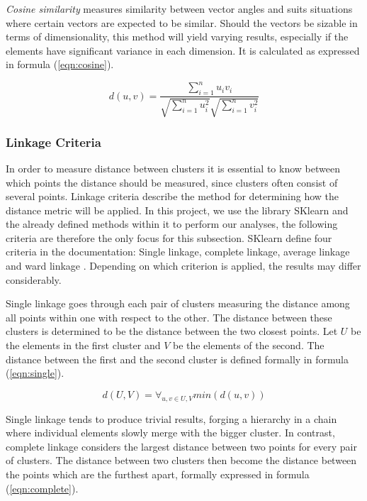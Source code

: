 \textit{Cosine similarity} measures similarity between vector angles and suits situations where certain vectors are expected to be similar. Should the vectors be sizable in terms of dimensionality, this method will yield varying results, especially if the elements have significant variance in each dimension. It is calculated as expressed in formula (\ref{eqn:cosine}).

\begin{equation}
\label{eqn:cosine}
d(u, v) = \frac{\sum_{i=1}^n u_iv_i}{\sqrt{\sum_{i=1}^n u_i^2}\sqrt{\sum_{i=1}^n v_i^2}}
\end{equation}

\subsubsection{Linkage Criteria}
In order to measure distance between clusters it is essential to know between which points the distance should be measured, since clusters often consist of several points. Linkage criteria describe the method for determining how the distance metric will be applied. In this project, we use the library SKlearn and the already defined methods within it to perform our analyses, the following criteria are therefore the only focus for this subsection. SKlearn define four criteria in the documentation: Single linkage, complete linkage, average linkage and ward linkage \cite{scikit}. Depending on which criterion is applied, the results may differ considerably.

Single linkage goes through each pair of clusters measuring the distance among all points within one with respect to the other. The distance between these clusters is determined to be the distance between the two closest points. Let $U$ be the elements in the first cluster and $V$ be the elements of the second. The distance between the first and the second cluster is defined formally in formula (\ref{eqn:single}).

\begin{equation}
\label{eqn:single}
d(U, V) = \forall_{u, v \in U, V} min(d(u, v))
\end{equation}

Single linkage tends to produce trivial results, forging a hierarchy in a chain where individual elements slowly merge with the bigger cluster. In contrast, complete linkage considers the largest distance between two points for every pair of clusters. The distance between two clusters then become the distance between the points which are the furthest apart, formally expressed in formula (\ref{eqn:complete}).

